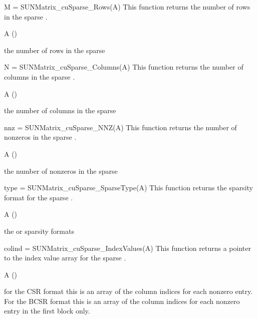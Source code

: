 {
  M = SUNMatrix\_cuSparse\_Rows(A)
}
{
  This function returns the number of rows in the sparse .
}
{
  \begin{args}
  \item[A] ()
  \end{args}
}
{
  the number of rows in the sparse 
}
{}

{
  N = SUNMatrix\_cuSparse\_Columns(A)
}
{
  This function returns the number of columns in the sparse .
}
{
  \begin{args}
  \item[A] ()
  \end{args}
}
{
  the number of columns in the sparse 
}
{}

{
  nnz = SUNMatrix\_cuSparse\_NNZ(A)
}
{
  This function returns the number of nonzeros in the sparse .
}
{
  \begin{args}
  \item[A] ()
  \end{args}
}
{
  the number of nonzeros in the sparse 
}
{}

{
  type = SUNMatrix\_cuSparse\_SparseType(A)
}
{
  This function returns the sparsity format for the sparse .
}
{
  \begin{args}
  \item[A] ()
  \end{args}
}
{
  the  or  sparsity formats
}
{}

{
  colind = SUNMatrix\_cuSparse\_IndexValues(A)
}
{
  This function returns a pointer to the index value array for the sparse
  .
}
{
  \begin{args}
  \item[A] ()
  \end{args}
}
{
  for the CSR format this is an array of the column indices for each nonzero
  entry. For the BCSR format this is an array of the column indices
  for each nonzero entry in the first block only.
}
{}

